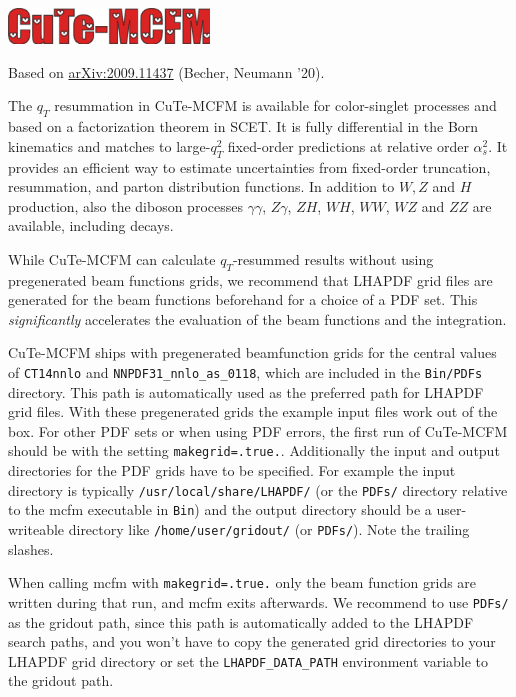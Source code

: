 \includegraphics[width=0.4\textwidth]{./sections/cute-mcfmpic.png}

Based on \href{https://arxiv.org/abs/2009.11437}{arXiv:2009.11437} (Becher, Neumann '20).

The $q_T$ resummation in CuTe-MCFM is available for color-singlet processes and based on a 
factorization theorem in SCET. It is fully differential in the Born kinematics and matches
to large-$q_T^2$ fixed-order predictions at relative order
$\alpha_s^2$. It provides an efficient way to estimate uncertainties from
fixed-order truncation, resummation, and parton distribution
functions. In addition to $W, Z$ and $H$ production, also the diboson
processes $\gamma\gamma$, $Z\gamma$, $ZH$, $WH$, $WW$, $WZ$ and $ZZ$ are available, including decays.

While CuTe-MCFM can calculate $q_T$-resummed results without using
pregenerated beam functions grids, we recommend that LHAPDF grid files are
generated for the beam functions beforehand for a choice of a PDF set. This
\emph{significantly} accelerates the evaluation of the beam functions and the
integration.

CuTe-MCFM ships with pregenerated beamfunction grids for the central
values of \texttt{CT14nnlo} and \texttt{NNPDF31\_nnlo\_as\_0118}, which
are included in the \texttt{Bin/PDFs} directory. This path is automatically used
as the preferred path for LHAPDF grid files. With these pregenerated
grids the example input files work out of the box. For other PDF sets or
when using PDF errors, the first run of CuTe-MCFM should be with the
setting \texttt{makegrid=.true.}. Additionally the input and output
directories for the PDF grids have to be specified. For example the
input directory is typically \texttt{/usr/local/share/LHAPDF/} (or the
\texttt{PDFs/} directory relative to the mcfm executable in \texttt{Bin}) and
the output directory should be a user-writeable directory like
\texttt{/home/user/gridout/} (or \texttt{PDFs/}). Note the trailing slashes.

When calling mcfm with \texttt{makegrid=.true.} only the beam function
grids are written during that run, and mcfm exits afterwards.
We recommend to use \texttt{PDFs/} as the gridout path, since this
path is automatically added to the LHAPDF search paths, and you won't have to
copy the generated grid directories to your LHAPDF grid directory or set the
\texttt{LHAPDF\_DATA\_PATH} environment variable to the gridout path.

